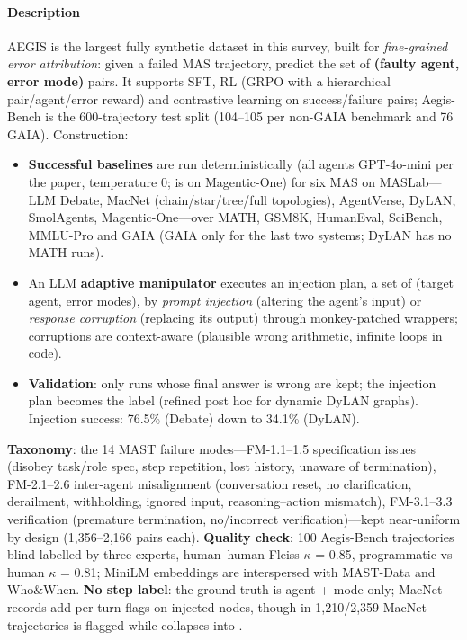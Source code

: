 \paragraph{Description} AEGIS is the largest fully synthetic dataset in this survey, built for \emph{fine-grained error attribution}: given a failed MAS trajectory, predict the set of \textbf{(faulty agent, error mode)} pairs. It supports SFT, RL (GRPO with a hierarchical pair/agent/error reward) and contrastive learning on success/failure pairs; Aegis-Bench is the 600-trajectory test split (104--105 per non-GAIA benchmark and 76 GAIA). Construction:
\begin{itemize}
\item \textbf{Successful baselines} are run deterministically (all agents GPT-4o-mini per the paper, temperature 0;  is  on Magentic-One) for six MAS on MASLab---LLM Debate, MacNet (chain/star/tree/full topologies), AgentVerse, DyLAN, SmolAgents, Magentic-One---over MATH, GSM8K, HumanEval, SciBench, MMLU-Pro and GAIA (GAIA only for the last two systems; DyLAN has no MATH runs).
\item An LLM \textbf{adaptive manipulator} executes an injection plan, a set of (target agent, error modes), by \emph{prompt injection} (altering the agent's input) or \emph{response corruption} (replacing its output) through monkey-patched wrappers; corruptions are context-aware (plausible wrong arithmetic, infinite loops in code).
\item \textbf{Validation}: only runs whose final answer is wrong are kept; the injection plan becomes the label (refined post hoc for dynamic DyLAN graphs). Injection success: 76.5\% (Debate) down to 34.1\% (DyLAN).
\end{itemize}
\textbf{Taxonomy}: the 14 MAST failure modes---FM-1.1--1.5 specification issues (disobey task/role spec, step repetition, lost history, unaware of termination), FM-2.1--2.6 inter-agent misalignment (conversation reset, no clarification, derailment, withholding, ignored input, reasoning--action mismatch), FM-3.1--3.3 verification (premature termination, no/incorrect verification)---kept near-uniform by design (1,356--2,166 pairs each). \textbf{Quality check}: 100 Aegis-Bench trajectories blind-labelled by three experts, human--human Fleiss $\kappa$ = 0.85, programmatic-vs-human $\kappa$ = 0.81; MiniLM embeddings are interspersed with MAST-Data and Who\&When. \textbf{No step label}: the ground truth is agent + mode only; MacNet records add per-turn  flags on injected nodes, though in 1,210/2,359 MacNet trajectories  is flagged while  collapses  into .

